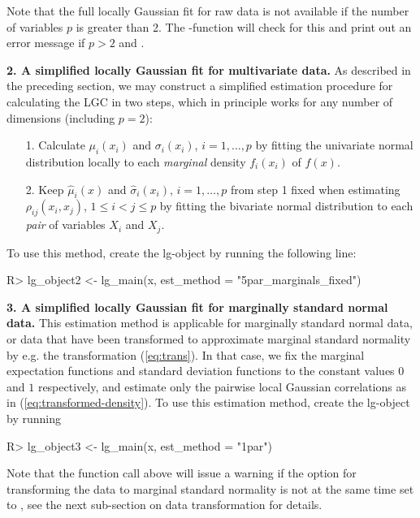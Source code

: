 Note that the full locally Gaussian fit for raw data is not available if the number of variables $p$ is greater than 2. The -function will check for this and print out an error message if $p>2$ and .

\textbf{2. A simplified locally Gaussian fit for multivariate data.} As described in the preceding section, we may construct a simplified estimation procedure for calculating the LGC in two steps, which in principle works for any number of dimensions (including $p=2$):

\begin{itemize}
\item[1.] Calculate $\mu_i(x_i)$ and $\sigma_i(x_i)$, $i = 1,\ldots,p$ by fitting the univariate normal distribution locally to each \emph{marginal} density $f_i(x_i)$ of $f(x)$.
\item[2.] Keep $\widehat\mu_i(x)$ and $\widehat\sigma_i(x_i)$, $i=1,\ldots,p$ from step 1 fixed when estimating $\rho_{ij}(x_i, x_j)$, $1\leq i<j\leq p$ by fitting the bivariate normal distribution to each \emph{pair} of variables $X_i$ and $X_j$.
\end{itemize}
To use this method, create the lg-object by running the following line:

\begin{example}
R> lg_object2 <- lg_main(x, est_method = "5par_marginals_fixed")
\end{example}

\textbf{3. A simplified locally Gaussian fit for marginally standard normal data.} This estimation method is applicable for marginally standard normal data, or data that have been transformed to approximate marginal standard normality by e.g. the transformation (\ref{eq:trans}). In that case, we fix the marginal expectation functions and standard deviation functions to the constant values $0$ and $1$ respectively, and estimate only the pairwise local Gaussian correlations as in (\ref{eq:transformed-density}). To use this estimation method, create the lg-object by running

\begin{example}
R> lg_object3 <- lg_main(x, est_method = "1par")
\end{example}

Note that the function call above will issue a warning if the option for transforming the data to marginal standard normality is not at the same time set to , see the next sub-section on data transformation for details.

